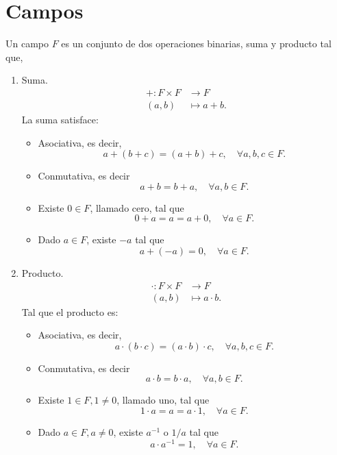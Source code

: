 \documentclass[12pt,a4paper]{book}
\begin{document}
    \section{Campos}
    Un campo $F$ es un conjunto de dos operaciones binarias, suma y producto tal que,
    \begin{enumerate}
        \item Suma.
        \begin{align*}
            +: F \times F &\to F \\
            (a,b) &\mapsto a+b.
        \end{align*}
        La suma satisface:
        \begin{itemize}
            \item Asociativa, es decir, 
            $$a + (b + c) = (a + b) + c, \quad \forall a,b,c \in F.$$
            \item Conmutativa, es decir
            $$a + b = b + a, \quad \forall a,b \in F.$$
            \item Existe $0 \in F$, llamado cero, tal que
            $$0 + a = a = a + 0, \quad \forall a \in F.$$
            \item Dado $a \in F$, existe $-a$ tal que
            $$a + (-a) = 0, \quad \forall a \in F.$$
        \end{itemize}
        
        \item Producto.
        \begin{align*}
            \cdot: F \times F &\to F \\
            (a,b) &\mapsto a \cdot b.
        \end{align*}
        Tal que el producto es:
        \begin{itemize}
            \item Asociativa, es decir, 
            $$a \cdot (b \cdot c) = (a \cdot b) \cdot c, \quad \forall a,b,c \in F.$$
            \item Conmutativa, es decir
            $$a \cdot b = b \cdot a, \quad \forall a,b \in F.$$
            \item Existe $1 \in F,1 \ne 0$, llamado uno, tal que
            $$1 \cdot a = a = a \cdot 1, \quad \forall a \in F.$$
            \item Dado $a \in F, a \ne 0$, existe $a^{-1} \text{ o } 1/a$ tal que
            $$a \cdot a^{-1} = 1, \quad \forall a \in F.$$
        \end{itemize}
    \end{enumerate}
\end{document}
